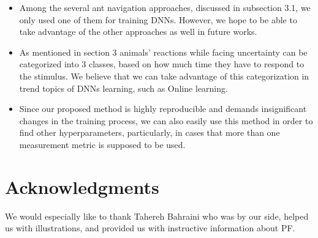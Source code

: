 \documentclass[12pt,a4paper]{article}
\begin{document}
	\begin{itemize}
		\item Among the several ant navigation approaches, discussed in subsection 3.1, we only used one of them for training DNNs. However, we hope to be able to take advantage of the other approaches as well in future works.
		\item As mentioned in section 3 animals' reactions while facing uncertainty can be categorized into 3 classes, based on how much time they have to respond to the stimulus. We believe that we can take advantage of this categorization in trend topics of DNNs learning, such as Online learning.
		\item Since our proposed method is highly reproducible and demands insignificant changes in the training process, we can also easily use this method in order to find other hyperparameters, particularly, in cases that more than one measurement metric is supposed to be used.
	\end{itemize}
	
	\section*{Acknowledgments}
	We would especially like to thank Tahereh Bahraini who was by our side, helped us with illustrations, and provided us with instructive information about PF.
	
\end{document}
